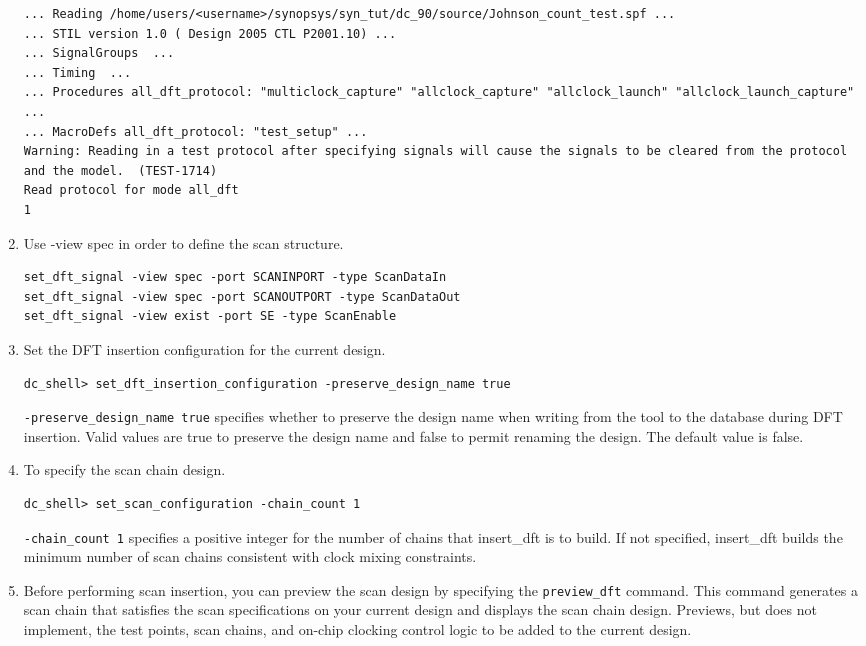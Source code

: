 \documentclass[a4paper,12pt,twoside]{article}
\begin{document}
\begin{enumerate}
\begin{verbatim}
... Reading /home/users/<username>/synopsys/syn_tut/dc_90/source/Johnson_count_test.spf ...
... STIL version 1.0 ( Design 2005 CTL P2001.10) ...
... SignalGroups  ...
... Timing  ...
... Procedures all_dft_protocol: "multiclock_capture" "allclock_capture" "allclock_launch" "allclock_launch_capture" ...
... MacroDefs all_dft_protocol: "test_setup" ...
Warning: Reading in a test protocol after specifying signals will cause the signals to be cleared from the protocol and the model.  (TEST-1714)
Read protocol for mode all_dft
1
    \end{verbatim}
    \item Use -view spec in order to define the scan structure.
    \begin{verbatim}
set_dft_signal -view spec -port SCANINPORT -type ScanDataIn
set_dft_signal -view spec -port SCANOUTPORT -type ScanDataOut
set_dft_signal -view exist -port SE -type ScanEnable
    \end{verbatim}
    \item Set the DFT insertion configuration for the current design.
    \begin{verbatim}
dc_shell> set_dft_insertion_configuration -preserve_design_name true
    \end{verbatim}
    \texttt{-preserve\_design\_name true} specifies whether to preserve the design name when writing from the tool to the database during DFT insertion. Valid values are true to preserve the design name and false to permit renaming the design. The default value is false.
    \item To specify the scan chain design.
    \begin{verbatim}
dc_shell> set_scan_configuration -chain_count 1
    \end{verbatim}
    \texttt{-chain\_count 1} specifies a positive integer for the number of chains that insert\_dft is to build. If not specified, insert\_dft builds the minimum number of scan chains consistent with clock mixing constraints.
    \item Before performing scan insertion, you can preview the scan design by specifying the \texttt{preview\_dft} command. This command generates a scan chain that satisfies the scan specifications on your current design and displays the scan chain design. Previews, but does not implement, the test points, scan chains, and on-chip clocking control logic to be added to the current design.
    \begin{verbatim}

\end{verbatim}
\end{enumerate}
\end{document}

